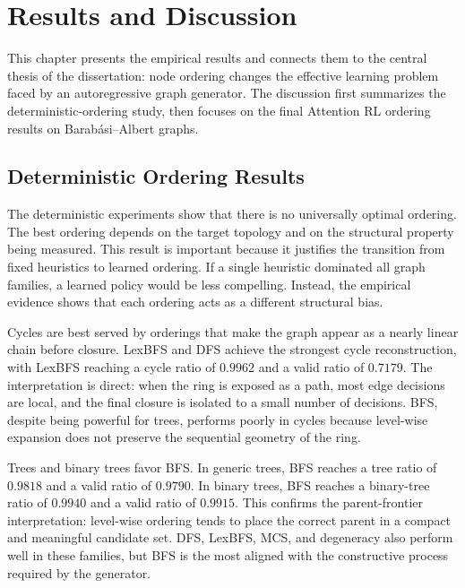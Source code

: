 \chapter{Results and Discussion}
\label{chap:results-discussion}

This chapter presents the empirical results and connects them to the central thesis of the dissertation: node ordering changes the effective learning problem faced by an autoregressive graph generator. The discussion first summarizes the deterministic-ordering study, then focuses on the final Attention RL ordering results on Barab\'asi--Albert graphs.

\section{Deterministic Ordering Results}
\label{sec:results-deterministic}

The deterministic experiments show that there is no universally optimal ordering. The best ordering depends on the target topology and on the structural property being measured. This result is important because it justifies the transition from fixed heuristics to learned ordering. If a single heuristic dominated all graph families, a learned policy would be less compelling. Instead, the empirical evidence shows that each ordering acts as a different structural bias.

Cycles are best served by orderings that make the graph appear as a nearly linear chain before closure. LexBFS and DFS achieve the strongest cycle reconstruction, with LexBFS reaching a cycle ratio of $0.9962$ and a valid ratio of $0.7179$. The interpretation is direct: when the ring is exposed as a path, most edge decisions are local, and the final closure is isolated to a small number of decisions. BFS, despite being powerful for trees, performs poorly in cycles because level-wise expansion does not preserve the sequential geometry of the ring.

Trees and binary trees favor BFS. In generic trees, BFS reaches a tree ratio of $0.9818$ and a valid ratio of $0.9790$. In binary trees, BFS reaches a binary-tree ratio of $0.9940$ and a valid ratio of $0.9915$. This confirms the parent-frontier interpretation: level-wise ordering tends to place the correct parent in a compact and meaningful candidate set. DFS, LexBFS, MCS, and degeneracy also perform well in these families, but BFS is the most aligned with the constructive process required by the generator.

